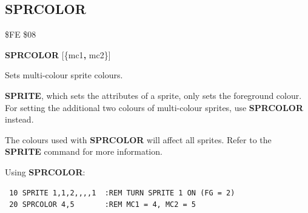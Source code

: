 \subsection{SPRCOLOR}
\begin{description}[leftmargin=2cm,style=nextline]
\item [Token:] \$FE \$08
\item [Format:] {\bf SPRCOLOR} [\{mc1{\bf,} mc2\}]
\item [Usage:]  Sets multi-colour sprite colours.

                {\bf SPRITE}, which sets the
                attributes of a sprite, only sets the foreground
                colour. For setting the additional two colours
                of multi-colour sprites, use {\bf SPRCOLOR} instead.

\item [Remarks:] The colours used with {\bf SPRCOLOR} will affect all sprites.
                 Refer to the {\bf SPRITE} command for more information.

\item [Example:] Using {\bf SPRCOLOR}:
\begin{tcolorbox}[colback=black,coltext=white]
\verbatimfont{\codefont}
\begin{verbatim}
 10 SPRITE 1,1,2,,,,1  :REM TURN SPRITE 1 ON (FG = 2)
 20 SPRCOLOR 4,5       :REM MC1 = 4, MC2 = 5
\end{verbatim}
\end{tcolorbox}
\end{description}


\newpage
